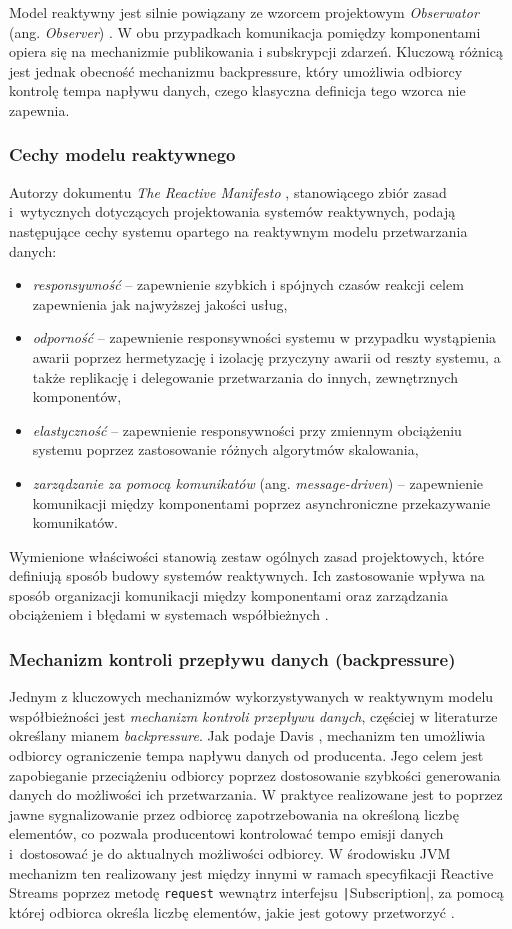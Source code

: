 Model reaktywny jest silnie powiązany ze wzorcem projektowym \emph{Obserwator} (ang. \emph{Observer}) \cite{gamma1995}. W obu przypadkach komunikacja pomiędzy komponentami opiera się na mechanizmie publikowania i subskrypcji zdarzeń. Kluczową różnicą jest jednak obecność mechanizmu backpressure, który umożliwia odbiorcy kontrolę tempa napływu danych, czego klasyczna definicja tego wzorca nie zapewnia.

\subsubsection{Cechy modelu reaktywnego}
Autorzy dokumentu \emph{The Reactive Manifesto} \cite{reactive-manifesto-page}, stanowiącego zbiór zasad i~wytycznych dotyczących projektowania systemów reaktywnych, podają następujące cechy systemu opartego na reaktywnym modelu przetwarzania danych:
\begin{itemize}
    \item \emph{responsywność} -- zapewnienie szybkich i spójnych czasów reakcji celem zapewnienia jak najwyższej jakości usług,
    \item \emph{odporność} -- zapewnienie responsywności systemu w przypadku wystąpienia awarii poprzez hermetyzację i izolację przyczyny awarii od reszty systemu, a także replikację i delegowanie przetwarzania do innych, zewnętrznych komponentów,
    \item \emph{elastyczność} -- zapewnienie responsywności przy zmiennym obciążeniu systemu poprzez zastosowanie różnych algorytmów skalowania,
    \item \emph{zarządzanie za pomocą komunikatów} (ang. \emph{message-driven}) -- zapewnienie komunikacji między komponentami poprzez asynchroniczne przekazywanie komunikatów.
\end{itemize}
Wymienione właściwości stanowią zestaw ogólnych zasad projektowych, które definiują sposób budowy systemów reaktywnych. Ich zastosowanie wpływa na sposób organizacji komunikacji między komponentami oraz zarządzania obciążeniem i błędami w systemach współbieżnych \cite{reactive-manifesto-page}. 

\subsubsection{Mechanizm kontroli przepływu danych (backpressure)}
Jednym z kluczowych mechanizmów wykorzystywanych w reaktywnym modelu współbieżności jest \emph{mechanizm kontroli przepływu danych}, częściej w literaturze określany mianem \emph{backpressure}. Jak podaje Davis \cite{davis2019}, mechanizm ten umożliwia odbiorcy ograniczenie tempa napływu danych od producenta. Jego celem jest zapobieganie przeciążeniu odbiorcy poprzez dostosowanie szybkości generowania danych do możliwości ich przetwarzania. W praktyce realizowane jest to poprzez jawne sygnalizowanie przez odbiorcę zapotrzebowania na określoną liczbę elementów, co pozwala producentowi kontrolować tempo emisji danych i~dostosować je do aktualnych możliwości odbiorcy. W środowisku JVM mechanizm ten realizowany jest między innymi w ramach specyfikacji Reactive Streams poprzez metodę \texttt{request} wewnątrz interfejsu \texttt|Subscription|, za pomocą której odbiorca określa liczbę elementów, jakie jest gotowy przetworzyć \cite{java-flow}.
